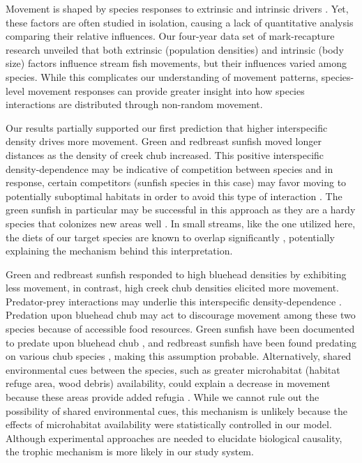 \documentclass[11pt, class=article, crop=false]{standalone}
\begin{document}
Movement is shaped by species responses to extrinsic and intrinsic drivers \citep{clobertDispersalEcologyEvolution2012}. Yet, these factors are often studied in isolation, causing a lack of quantitative analysis comparing their relative influences. Our four-year data set of mark-recapture research unveiled that both extrinsic (population densities) and intrinsic (body size) factors influence stream fish movements, but their influences varied among species. While this complicates our understanding of movement patterns, species-level movement responses can provide greater insight into how species interactions are distributed through non-random movement. 

Our results partially supported our first prediction that higher interspecific density drives more movement. Green and redbreast sunfish moved longer distances as the density of creek chub increased. This positive interspecific density-dependence may be indicative of competition between species and in response, certain competitors (sunfish species in this case) may favor moving to potentially suboptimal habitats in order to avoid this type of interaction \citep{jacobHabitatChoiceMeets2018, thierryInterplayAbioticBiotic2024}. The green sunfish in particular may be successful in this approach as they are a hardy species that colonizes new areas well \citep{lemlySuppressionNativeFish1985, moyleInlandFishesCalifornia2002}. In small streams, like the one utilized here, the diets of our target species are known to overlap significantly \citep{collarPISCIVORYLIMITSDIVERSIFICATION2009, lemlySuppressionNativeFish1985, karrAssessmentBioticIntegrity1981, leonardApplicationTestingIndex1986}, potentially explaining the mechanism behind this interpretation.  

Green and redbreast sunfish responded to high bluehead densities by exhibiting less movement, in contrast, high creek chub densities elicited more movement. Predator-prey interactions may underlie this interspecific density-dependence \citep{jacobHabitatMatchingSpatial2015}. Predation upon bluehead chub may act to discourage movement among these two species because of accessible food resources. Green sunfish have been documented to predate upon bluehead chub \citep{lemlySuppressionNativeFish1985}, and redbreast sunfish have been found predating on various chub species \citep{borrelliPuttingLakeTogether2023}, making this assumption probable. Alternatively, shared environmental cues between the species, such as greater microhabitat (habitat refuge area, wood debris) availability, could explain a decrease in movement because these areas provide added refugia \citep{careyEffectsLittoralHabitat2010}. While we cannot rule out the possibility of shared environmental cues, this mechanism is unlikely because the effects of microhabitat availability were statistically controlled in our model. Although experimental approaches are needed to elucidate biological causality, the trophic mechanism is more likely in our study system. 
\end{document}
